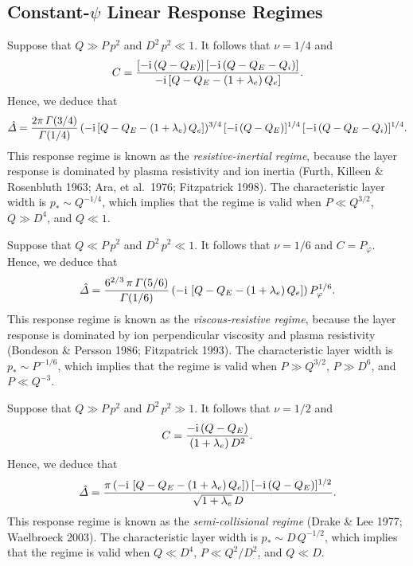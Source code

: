 \documentclass[notitlepage,12pt]{article}
\begin{document}
\subsection{Constant-$\psi$ Linear Response Regimes}\label{scp}
Suppose that $Q\gg P\,p^2$ and $D^2\,p^2 \ll 1$. It follows that $\nu=1/4$ and
\begin{equation}
C = \frac{[-{\rm i}\,(Q-Q_E)]\,[-{\rm i}\,(Q-Q_E-Q_i)]}{-{\rm i}\,[Q-Q_E-(1+\lambda_e)\,Q_e]}.
\end{equation}
Hence, we deduce that
\begin{equation}\label{ri}
\hat{\mit\Delta} = \frac{2\pi\,{\mit\Gamma}(3/4)}{{\mit\Gamma}(1/4)}\,(-{\rm i}\,[Q-Q_E-(1+\lambda_e)\,Q_e])^{3/4}\,[-{\rm i}\,(Q-Q_E)]^{1/4}\,[-{\rm i}\,(Q-Q_E-Q_i)]^{1/4}.
\end{equation}
This response regime is known as the {\em resistive-inertial regime}, because the layer response is dominated by
plasma resistivity and ion inertia (Furth, Killeen \& Rosenbluth 1963; Ara, et al.\ 1976; Fitzpatrick 1998). The characteristic layer width is $p_\ast \sim Q^{-1/4}$,
which implies that the regime is valid when $P\ll Q^{3/2}$, $Q\gg D^4$, and $Q\ll 1$. 

Suppose that $Q\ll P\,p^2$ and $D^2\,p^2\ll 1$. It follows that $\nu=1/6$ and $C=P_\varphi$. 
Hence, we deduce that
\begin{equation}\label{vr}
\hat{\mit\Delta} = \frac{6^{2/3}\,\pi\,{\mit\Gamma}(5/6)}{{\mit\Gamma}(1/6)}\, (-{\rm i}\,\left[Q-Q_E-(1+\lambda_e)\,Q_e\right])\,P_\varphi^{1/6}.
\end{equation}
This response regime is known as the {\em viscous-resistive regime}, because the layer response is dominated by
ion perpendicular viscosity and plasma resistivity  (Bondeson \& Persson 1986; Fitzpatrick 1993). The characteristic layer width is $p_\ast \sim P^{-1/6}$, which implies that
the regime is valid when  $P\gg Q^{3/2}$, $P\gg D^6$, and $P\ll Q^{-3}$. 

Suppose that $Q\gg P\,p^2$ and $D^2\,p^2\gg 1$. It follows that $\nu=1/2$ and
\begin{equation}
C = \frac{-{\rm i}\,(Q-Q_E)}{(1+\lambda_e)\,D^2}.
\end{equation}
Hence, we deduce that
\begin{equation}\label{sc}
\hat{\mit\Delta}= \frac{\pi\,(-{\rm i}\,\left[Q-Q_E-(1+\lambda_e)\,Q_e\right])\,[-{\rm i}\,(Q-Q_E)]^{1/2}}{\sqrt{1+\lambda_e}\,D}.
\end{equation}
This response regime is known as the {\em semi-collisional regime}\/ (Drake \& Lee 1977; Waelbroeck 2003). The characteristic
layer width is $p_\ast\sim D\,Q^{-1/2}$, which implies that the regime is valid when $Q\ll D^4$,
 $P\ll Q^2/D^2$, and $Q\ll D$. 
\end{document}
